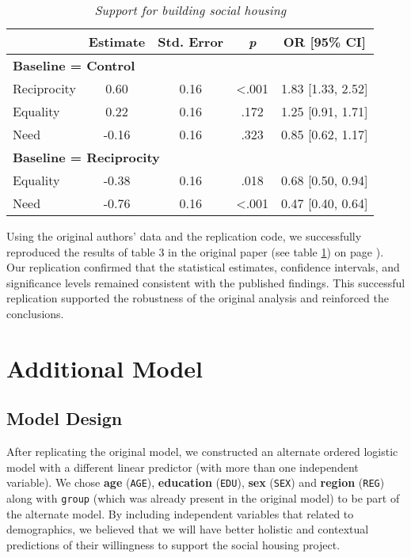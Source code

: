 \documentclass[titlepage]{article}
\begin{document}
\begin{table}[H]
    \centering
    \caption{\textit{Support for building social housing}}
    \label{table:replicationtable}
    \begin{tabular}{lcccc}
        \toprule
        & Estimate & Std. Error & \textit{p} & OR [95\% CI] \\
        \midrule
        \multicolumn{5}{l}{\textbf{Baseline = Control}} \\
        Reciprocity & 0.60 & 0.16 &  \textless{}.001 & 1.83 [1.33, 2.52] \\
        Equality & 0.22 & 0.16 & .172 & 1.25 [0.91, 1.71] \\
        Need & -0.16 & 0.16 & .323 & 0.85 [0.62, 1.17] \\
        \midrule
        \multicolumn{5}{l}{\textbf{Baseline = Reciprocity}} \\
        Equality & -0.38 & 0.16 & .018 & 0.68 [0.50, 0.94] \\
        Need & -0.76 & 0.16 & \textless{}.001 & 0.47 [0.40, 0.64] \\
        \bottomrule
    \end{tabular}
\end{table}

\justify
Using the original authors' data and the replication code, we successfully reproduced the results of table 3 in the original paper (see table \ref{table:replicationtable}) on page \pageref{table:replicationtable}). Our replication confirmed that the statistical estimates, confidence intervals, and significance levels remained consistent with the published findings. This successful replication supported the robustness of the original analysis and reinforced the conclusions.

\section{Additional Model}
\subsection{Model Design}
After replicating the original model, we constructed an alternate ordered logistic model with a different linear predictor (with more than one independent variable). We chose \textbf{age} (\texttt{AGE}), \textbf{education} (\texttt{EDU}), \textbf{sex} (\texttt{SEX}) and \textbf{region} (\texttt{REG}) along with \texttt{group} (which was already present in the original model) to be part of the alternate model. By including independent variables that related to demographics, we believed that we will have better holistic and contextual predictions of their willingness to support the social housing project.
\end{document}

